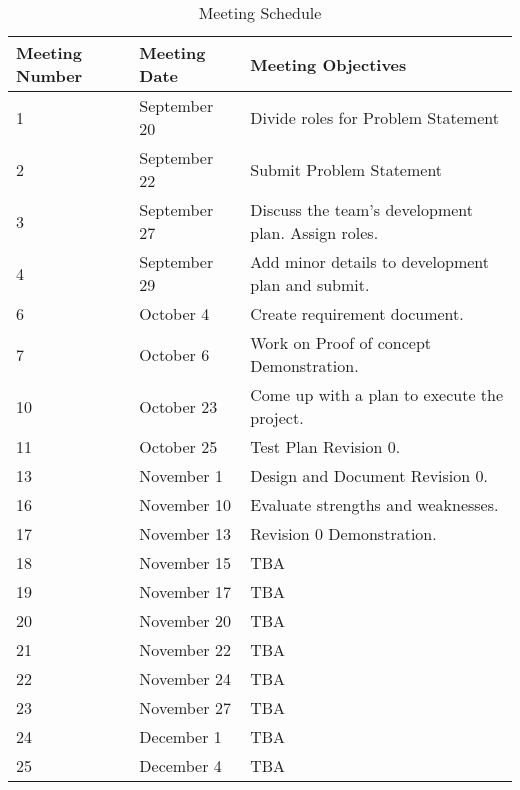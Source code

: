 \documentclass[a4paper]{article}
\begin{document}
    
\begin{table}[H]
    \centering
    \caption{Meeting Schedule}
    \begin{tabular}{|l|l|l|}
    \hline
    Meeting Number & Meeting Date & Meeting Objectives \\
    \hline
    1              & September 20  &Divide roles for Problem Statement \\
    \hline
    2               & September 22 &  Submit Problem Statement\\
    \hline
    3               & September 27 &Discuss the team's development plan. Assign roles.\\
    \hline
    4               & September 29 &Add minor details to development plan and submit.\\
    \hline
    6               & October 4    &Create requirement document.\\
    \hline
    7               & October 6    &Work on Proof of concept Demonstration.\\
    \hline
    10               & October 23   &Come up with a plan to execute the project.\\
    \hline
    11               & October 25   &Test Plan Revision 0. \\
    \hline
    13               & November 1   &Design and Document Revision 0.\\
    \hline
    16               & November 10   &Evaluate strengths and weaknesses.\\
    \hline
    17               & November 13   &Revision 0 Demonstration.\\
    \hline
    18               & November 15   &TBA\\
    \hline
    19               & November 17   &TBA\\
    \hline
    20               & November 20   &TBA\\
    \hline
    21               & November 22   &TBA \\
    \hline
    22               & November 24   &TBA\\
    \hline
    23               & November 27   &TBA\\
    \hline
    24               & December 1   &TBA\\
    \hline
    25               & December 4   &  TBA\\   
    \hline
    
    \end{tabular}
    \end{table}
    
\end{document}

